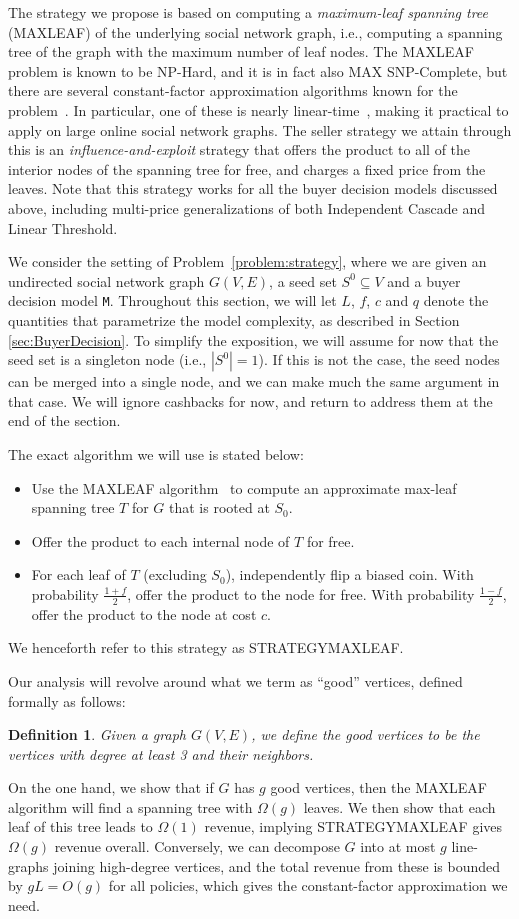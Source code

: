 \documentclass[letterpaper,twoside]{article}
\newtheorem{defn}{Definition}
\newcommand{\M}{\texttt{M}}
\newcommand{\maxleaf}{\textrm{M{\scriptsize AX}\-L{\scriptsize EAF}}}
\newcommand{\strategyml}{\textrm{S{\scriptsize TRATEGY}\-M{\scriptsize AX}\-L{\scriptsize EAF}}}
\begin{document}
The strategy we propose is based on computing a {\em maximum-leaf
  spanning tree} (\maxleaf) of the underlying social network graph,
i.e., computing a spanning tree of the graph with the maximum number
of leaf nodes. The \maxleaf{} problem is known to be NP-Hard, and it
is in fact also MAX SNP-Complete, but there are several
constant-factor approximation algorithms known for the
problem~\cite{GJ79,KW91,LR98,Solis98}. In particular, one of these
is nearly linear-time~\cite{LR98}, making it practical to apply on
large online social network graphs. The seller strategy we attain
through this is an {\em influence-and-exploit} strategy that offers
the product to all of the interior nodes of the spanning tree for
free, and charges a fixed price from the leaves. Note that this
strategy works for all the buyer decision models discussed above,
including multi-price generalizations of both Independent Cascade
and Linear Threshold.

We consider the setting of Problem~\ref{problem:strategy}, where we
are given an undirected social network graph $G(V,E)$, a seed set
$S^0\subseteq V$ and a buyer decision model \M.  Throughout this
section, we will let $L$, $f$, $c$ and $q$ denote the quantities
that parametrize the model complexity, as described in Section
\ref{sec:BuyerDecision}. To simplify the exposition, we will assume
for now that the seed set is a singleton node  (i.e., $|S^0|=1$). If
this is not the case, the seed nodes can be merged into a single node,
and we can make much the same argument in that case. We will ignore
cashbacks for now, and return to address them at the end of the section.

The exact algorithm we will use is stated below:
\begin{itemize}
    \item Use the \maxleaf{} algorithm~\cite{LR98} to compute an
    approximate max-leaf spanning tree $T$ for $G$ that is rooted at
    $S_0$.
    \item Offer the product to each internal node of $T$ for free.
    \item For each leaf of $T$ (excluding $S_0$), independently flip a biased coin.
    With probability $\frac{1+f}{2}$, offer the product to the node
    for free. With probability $\frac{1-f}{2}$, offer the product to
    the node at cost $c$.
\end{itemize}
We henceforth refer to this strategy as \strategyml.

Our analysis will revolve around what we term as ``good'' vertices, defined
formally as follows:
\begin{defn}
  Given a graph $G(V,E)$, we define the {\em good} vertices to be
  the vertices with degree at least 3 and their neighbors.
\end{defn}
On the one hand, we show that if $G$ has $g$ good vertices, then the
\maxleaf{} algorithm will find a spanning tree with $\Omega(g)$
leaves. We then show that each leaf of this tree leads to
$\Omega(1)$ revenue, implying \strategyml{} gives $\Omega(g)$ revenue
overall. Conversely, we can decompose $G$ into at most $g$
line-graphs joining high-degree vertices, and the total revenue from
these is bounded by $gL = O(g)$ for all policies, which gives the
constant-factor approximation we need.
\end{document}
